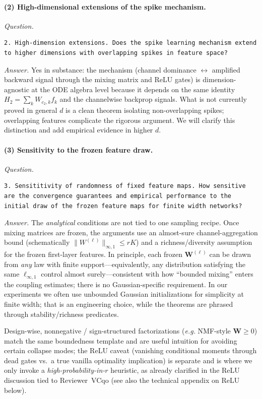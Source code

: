 \documentclass[11pt,a4paper]{article}
\begin{document}
\paragraph{(2) High-dimensional extensions of the spike mechanism.}
\textit{Question.}\par
\begin{verbatim}
2. High-dimension extensions. Does the spike learning mechanism extend to higher dimensions with overlapping spikes in feature space?
\end{verbatim}
\textit{Answer.} Yes in substance: the mechanism (channel dominance $\leftrightarrow$ amplified backward signal through the mixing matrix and ReLU gates) is dimension-agnostic at the ODE algebra level because it depends on the same identity $H_2=\sum_k W_{c_2,k}f_k$ and the channelwise backprop signals. What is not currently proved in general $d$ is a clean theorem isolating non-overlapping spikes; overlapping features complicate the rigorous argument. We will clarify this distinction and add empirical evidence in higher $d$.

\paragraph{(3) Sensitivity to the frozen feature draw.}
\textit{Question.}\par
\begin{verbatim}
3. Sensititivity of randomness of fixed feature maps. How sensitive are the convergence guarantees and empirical performance to the initial draw of the frozen feature maps for finite width networks?
\end{verbatim}
\textit{Answer.} The \emph{analytical} conditions are not tied to one sampling recipe. Once mixing matrices are frozen, the arguments use an almost-sure channel-aggregation bound (schematically $\|W^{(\ell)}\|_{\infty,1}\le rK$) and a richness/diversity assumption for the frozen first-layer features. In principle, each frozen $\mathbf{W}^{(\ell)}$ can be drawn from \emph{any} law with finite support---equivalently, any distribution satisfying the same $\ell_{\infty,1}$ control almost surely---consistent with how ``bounded mixing'' enters the coupling estimates; there is no Gaussian-specific requirement. In our experiments we often use unbounded Gaussian initializations for simplicity at finite width; that is an engineering choice, while the theorems are phrased through stability/richness predicates.

Design-wise, nonnegative / sign-structured factorizations (\emph{e.g.} NMF-style $\mathbf{W}\ge 0$) match the same boundedness template and are useful intuition for avoiding certain collapse modes; the ReLU caveat (vanishing conditional moments through dead gates vs.\ a true vanilla optimality implication) is separate and is where we only invoke a \emph{high-probability-in-$r$} heuristic, as already clarified in the ReLU discussion tied to Reviewer~VCqo (see also the technical appendix on ReLU below).
\end{document}
